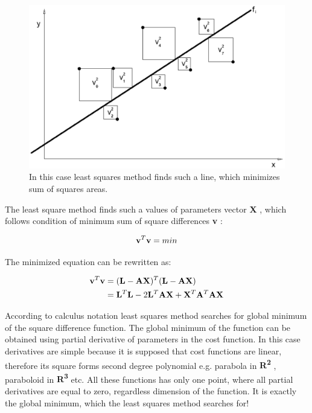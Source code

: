 \documentclass[a4paper,12pt]{article}
\newcommand{\ematr}[1]{
{\bf #1}
}
\newcommand{\evect}[1]{
{\bf #1}
}
\newcommand{\eucl}[1]{
{\bf R\textsuperscript{#1}}
}
\begin{document}
\begin{figure}[h]
    \centering
    \includegraphics[scale=0.2]{figures/squares.png}
    \caption{In this case least squares method finds such a line,
    which minimizes sum of squares areas. }
    \label{fig:squares}
\end{figure}

The least square method finds such a values of parameters vector \evect{X}, which 
follows condition of minimum sum of square differences \evect{v}: 

\begin{equation}
\evect{v}^{T} \evect{v} = min
\end{equation} 

The minimized equation can be rewritten as:

\begin{equation}
\begin{split}
\evect{v}^{T} \evect{v} &= (\evect{L} - \ematr{A}\ematr{X})^{T} (\evect{L} - \ematr{A}\ematr{X}) \\
&= \evect{L}^{T} \evect{L} - 2 \evect{L}^{T} \ematr{A} \evect{X} + \evect{X}^{T} \ematr{A}^{T} \ematr{A} \evect{X}
\label{eq:least_be_part}
\end{split}
\end{equation} 

According to calculus notation least squares method searches for global minimum of the square difference function. 
The global minimum of the function can be obtained using partial derivative of parameters in the cost function.
In this case derivatives are simple because it is supposed that cost functions are linear, therefore 
its square forms  second degree polynomial e.g. parabola in \eucl{2}, paraboloid in \eucl{3} etc. All these functions has
only one point, where all partial derivatives are equal to zero, regardless dimension of the function. It is 
exactly the global minimum, which the least squares method searches for!
\end{document}
